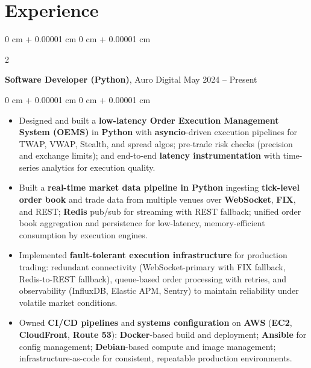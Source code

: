 \documentclass[10pt, letterpaper]{article}
\newenvironment{highlightsjustified}{
    \begin{itemize}[
        topsep=0.10 cm,
        parsep=0.10 cm,
        partopsep=0pt,
        itemsep=0pt,
        leftmargin=0 cm + 10pt
    ]
    \justifying
}{
    \end{itemize}
} %
\newenvironment{onecolentry}{
    \begin{adjustwidth}{
        0 cm + 0.00001 cm
    }{
        0 cm + 0.00001 cm
    }
}{
    \end{adjustwidth}
} %
\newenvironment{twocolentry}[2][]{
    \onecolentry
    \def\secondColumn{#2}
    \setcolumnwidth{\fill, 4.5 cm}
    \begin{paracol}{2}
}{
    \switchcolumn \raggedleft \secondColumn
    \end{paracol}
    \endonecolentry
} %
\begin{document}
    
    
    \section{Experience}



        
        \begin{twocolentry}{
            May 2024 – Present
        }
            \textbf{Software Developer (Python)}, Auro Digital\end{twocolentry}

        \vspace{0.10 cm}
        \begin{onecolentry}

            \begin{highlightsjustified}
                \item Designed and built a \textbf{low-latency Order Execution Management System (OEMS)} in \textbf{Python} with \textbf{asyncio}-driven execution pipelines for TWAP, VWAP, Stealth, and spread algos; pre-trade risk checks (precision and exchange limits); and end-to-end \textbf{latency instrumentation} with time-series analytics for execution quality.
                \item Built a \textbf{real-time market data pipeline in Python} ingesting \textbf{tick-level order book} and trade data from multiple venues over \textbf{WebSocket}, \textbf{FIX}, and REST; \textbf{Redis} pub/sub for streaming with REST fallback; unified order book aggregation and persistence for low-latency, memory-efficient consumption by execution engines.
                \item Implemented \textbf{fault-tolerant execution infrastructure} for production trading: redundant connectivity (WebSocket-primary with FIX fallback, Redis-to-REST fallback), queue-based order processing with retries, and observability (InfluxDB, Elastic APM, Sentry) to maintain reliability under volatile market conditions.
                \item Owned \textbf{CI/CD pipelines} and \textbf{systems configuration} on \textbf{AWS} (\textbf{EC2}, \textbf{CloudFront}, \textbf{Route 53}): \textbf{Docker}-based build and deployment; \textbf{Ansible} for config management; \textbf{Debian}-based compute and image management; infrastructure-as-code for consistent, repeatable production environments.
            \end{highlightsjustified}
    
    \end{onecolentry}
\end{document}
